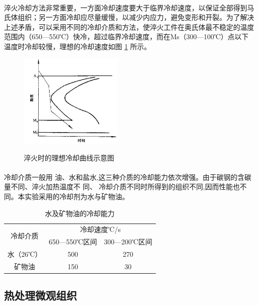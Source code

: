 \documentclass[12pt]{ctexart}
\begin{document}
 \paragraph{}
 淬火冷却方法非常重要，一方面冷却速度要大于临界冷却速度，以保证全部得到马氏体组织；另一方面冷却应尽量缓慢，以减少内应力，避免变形和开裂。为了解决上述矛盾，可以采用不同的冷却介质和方法，使淬火工件在奥氏体最不稳定的温度范围内（650—550℃）快冷，超过临界冷却速度，而在Ms（300—100℃）点以下温度时冷却较慢，理想的冷却速度如图 \ref{cuihuoquxian} 所示。
\begin{figure}[h]
  \centering
  \includegraphics[width=5cm]{cuihuoquxian.jpg}\\
  \caption{淬火时的理想冷却曲线示意图}
  \label{cuihuoquxian}
\end{figure}



 \paragraph{}
 冷却介质一般用 油、水和盐水,这三种介质的冷却能力依次增强。由于碳钢的含碳量不同、淬火加热温度不 同、 冷却介质不同时所得到的组织不同,因而性能也不同。本实验采用的冷却剂为水与矿物油。
\begin{table}[ht!]
  \centering
  \begin{tabular}{|c|c|c|}
     \hline
     \multirow{2}{*}{冷却介质}& \multicolumn{2}{c|}{冷却速度℃/s} \\
     \cline{2-3}
     &650—550℃区间& 300—200℃区间 \\
     \hline
     水（26℃）& 500 & 270 \\
     \hline
     矿物油 & 150 & 30 \\
     \hline
   \end{tabular}
  \caption{水及矿物油的冷却能力}
\end{table}
\subsection{热处理微观组织}
\end{document}
